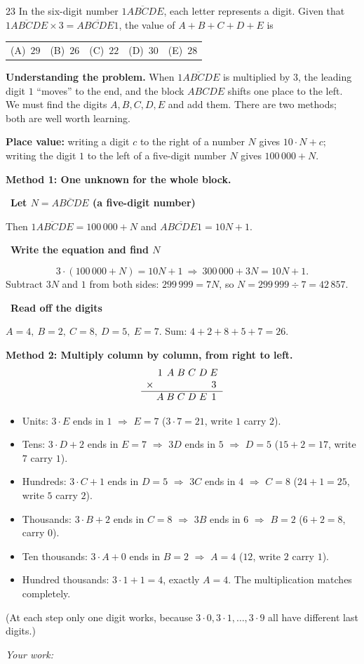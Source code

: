 \documentclass[11pt]{article}
\makeatletter
\newif\ifsol \solfalse
\newcommand{\probsol}[1]{%
  \begin{lrbox}{\solmeasure}\begin{minipage}{\dimexpr\linewidth-24pt\relax}#1\end{minipage}\end{lrbox}%
  \ifsol
    \begin{solbox}#1\end{solbox}%
  \else
    \setlength{\solht}{\dimexpr\ht\solmeasure+\dp\solmeasure+0.85cm\relax}%
    \ifdim\solht<1.35cm\setlength{\solht}{1.35cm}\fi
    \ifdim\solht>\StudentMaxWork\setlength{\solht}{\StudentMaxWork}\fi
    \begin{tcolorbox}[colback=white,colframe=Line,boxrule=0.8pt,arc=5pt,
      left=8pt,right=8pt,top=4pt,bottom=4pt,height=\solht]{\footnotesize\color{Slate}\itshape\WorkWord}\end{tcolorbox}%
  \fi}
\newcommand{\nd}[1]{\overline{#1}}
\newlength{\StudentMaxWork}\setlength{\StudentMaxWork}{7.5cm}
\newcommand{\step}[2]{\par\smallskip\noindent{\bfseries\color{tmBlue!85!black}\StepWord~#1.}\ {\bfseries #2}\par\nopagebreak}
\newcommand{\choices}[5]{\par\smallskip\noindent
  \begin{tabularx}{\linewidth}{@{}XXXXX@{}}(A)\ #1&(B)\ #2&(C)\ #3&(D)\ #4&(E)\ #5\end{tabularx}\par}
\def\WorkWord{Your work:}
\def\StepWord{Step}
\makeatother
\begin{document}
\begin{probbox}{23}{\relax}
In the six-digit number $\nd{1ABCDE}$, each letter represents a digit. Given that $\nd{1ABCDE}\times 3=\nd{ABCDE1}$, the value of $A+B+C+D+E$ is
\choices{$29$}{$26$}{$22$}{$30$}{$28$}
\end{probbox}
\probsol{
\textbf{Understanding the problem.} When $\nd{1ABCDE}$ is multiplied by $3$, the leading digit $1$ ``moves'' to the end, and the block $ABCDE$ shifts one place to the left. We must find the digits $A,B,C,D,E$ and add them. There are two methods; both are well worth learning.

\begin{recallbox}\textbf{Place value:} writing a digit $c$ to the right of a number $N$ gives $10\cdot N+c$; writing the digit $1$ to the left of a five-digit number $N$ gives $100\,000+N$.\end{recallbox}

\textbf{Method 1: One unknown for the whole block.}
\step{1}{Let $N=\nd{ABCDE}$ (a five-digit number)}
Then $\nd{1ABCDE}=100\,000+N$ and $\nd{ABCDE1}=10N+1$.
\step{2}{Write the equation and find $N$}
\[3\cdot(100\,000+N)=10N+1\ \Longrightarrow\ 300\,000+3N=10N+1.\]
Subtract $3N$ and $1$ from both sides: $299\,999=7N$, so $N=299\,999\div 7=42\,857$.
\step{3}{Read off the digits}
$A=4,\ B=2,\ C=8,\ D=5,\ E=7$. Sum: $4+2+8+5+7=26$.

\textbf{Method 2: Multiply column by column, from right to left.}
\[\begin{array}{r@{\;}c@{\;}c@{\;}c@{\;}c@{\;}c@{\;}c}
 & 1 & A & B & C & D & E\\
\times & & & & & & 3\\ \hline
 & A & B & C & D & E & 1
\end{array}\]
\begin{itemize}[leftmargin=1.4em,itemsep=1pt]
\item Units: $3\cdot E$ ends in $1$ $\Rightarrow$ $E=7$ ($3\cdot 7=21$, write $1$ carry $2$).
\item Tens: $3\cdot D+2$ ends in $E=7$ $\Rightarrow$ $3D$ ends in $5$ $\Rightarrow$ $D=5$ ($15+2=17$, write $7$ carry $1$).
\item Hundreds: $3\cdot C+1$ ends in $D=5$ $\Rightarrow$ $3C$ ends in $4$ $\Rightarrow$ $C=8$ ($24+1=25$, write $5$ carry $2$).
\item Thousands: $3\cdot B+2$ ends in $C=8$ $\Rightarrow$ $3B$ ends in $6$ $\Rightarrow$ $B=2$ ($6+2=8$, carry $0$).
\item Ten thousands: $3\cdot A+0$ ends in $B=2$ $\Rightarrow$ $A=4$ ($12$, write $2$ carry $1$).
\item Hundred thousands: $3\cdot 1+1=4$, exactly $A=4$. The multiplication matches completely.
\end{itemize}
(At each step only one digit works, because $3\cdot 0, 3\cdot 1,\dots,3\cdot 9$ all have different last digits.)

}
\end{document}
